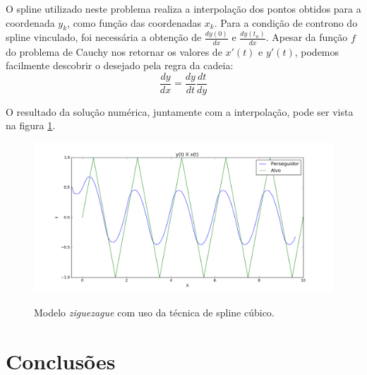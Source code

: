 \documentclass[a4paper,10pt]{article}
\begin{document}
  O spline utilizado neste problema realiza a interpolação dos pontos obtidos para a coordenada $y_k$, como função das coordenadas $x_k$. Para a condição de controno do spline vinculado, foi necessária a obtenção de $\frac{dy(0)}{dx}$ e $\frac{dy(t_n)}{dx}$. Apesar da função $f$ do problema de Cauchy nos retornar os valores de $x'(t)$ e $y'(t)$, podemos facilmente descobrir o desejado pela regra da cadeia:
  \begin{equation}
   \frac{dy}{dx} = \frac{dy}{dt} \frac{dt}{dy}
  \end{equation}
  
  O resultado da solução numérica, juntamente com a interpolação, pode ser vista na figura \ref{fig:curva-zz}.
  
  \begin{figure}[H]
   \includegraphics[width=\textwidth]{zz-XY-spline.png}
   \label{fig:curva-zz}
   \caption{Modelo \emph{ziguezague} com uso da técnica de spline cúbico.}
  \end{figure}
  
  \section{Conclusões}

  
  
\end{document}
